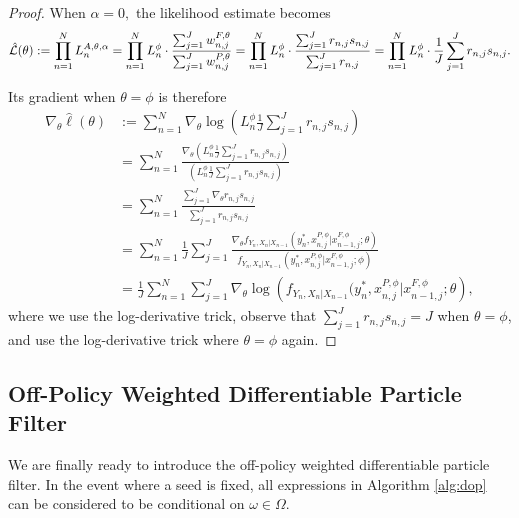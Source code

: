 \documentclass{article}
\begin{document}
\begin{proof}
    When $\alpha=0,$ the likelihood estimate becomes
\begin{equation}
    \hat{\mathcal{L}}(\theta) := \prod_{n=1}^N L_n^{A, \theta, \alpha} = \prod_{n=1}^N L_n^\phi \cdot \frac{\sum_{j=1}^J w_{n,j}^{F,\theta}}{\sum_{j=1}^J w_{n,j}^{P,\theta}} = \prod_{n=1}^N L_n^\phi \cdot \frac{\sum_{j=1}^J r_{n,j}s_{n,j}}{\sum_{j=1}^J r_{n,j}} = \prod_{n=1}^N L_n^\phi \cdot \frac{1}{J}\sum_{j=1}^J r_{n,j}s_{n,j}.
\end{equation}

Its gradient when $\theta=\phi$ is therefore 
\begin{align*}
    \nabla_\theta \hat{\ell}(\theta) &:= \sum_{n=1}^N \nabla_\theta \log\left(L_n^\phi \frac{1}{J} \sum_{j=1}^J r_{n,j}s_{n,j}\right) \\
    &= \sum_{n=1}^N \frac{\nabla_\theta \left(L_n^\phi \frac{1}{J} \sum_{j=1}^J r_{n,j}s_{n,j}\right)}{\left(L_n^\phi \frac{1}{J} \sum_{j=1}^J r_{n,j}s_{n,j}\right)} \\
    &= \sum_{n=1}^N \frac{\sum_{j=1}^J \nabla_\theta r_{n,j}s_{n,j}}{\sum_{j=1}^J r_{n,j}s_{n,j}} \\
    &= \sum_{n=1}^N \frac{1}{J} \sum_{j=1}^J \frac{\nabla_\theta f_{Y_n,X_n|X_{n-1}}(y_n^*, x_{n,j}^{P, \phi}|x_{n-1,j}^{F, \phi}; \theta)}{f_{Y_n, X_n|X_{n-1}}(y_n^*, x_{n,j}^{P, \phi}|x_{n-1,j}^{F, \phi}; \phi)} \\
    &= \frac{1}{J} \sum_{n=1}^N \sum_{j=1}^J \nabla_\theta \log\left(f_{Y_n,X_n|X_{n-1}}(y_n^*, x_{n,j}^{P, \phi}|x_{n-1,j}^{F, \phi}; \theta\right),
\end{align*}
where we use the log-derivative trick, observe that $\sum_{j=1}^J r_{n,j}s_{n,j} = J$ when $\theta=\phi$, and use the log-derivative trick where $\theta=\phi$ again. 
\end{proof}


\subsection{Off-Policy Weighted Differentiable Particle Filter}

We are finally ready to introduce the off-policy weighted differentiable particle filter. In the event where a seed is fixed, all expressions in Algorithm \ref{alg:dop} can be considered to be conditional on $\omega \in \Omega$.  
\end{document}
